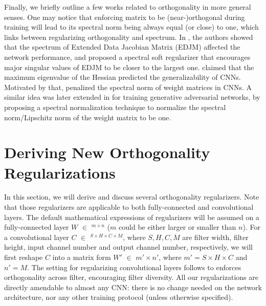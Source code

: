 \documentclass{article}
\newcounter{ass_counter}
\begin{document}
Finally, we briefly outline a few works related to orthogonality in more general senses. One may notice that enforcing matrix to be (near-)orthogonal during training will lead to its spectral norm being always equal (or close) to one, which links between regularizing orthogonality and spectrum. In \cite{wang2016analysis}, the authors showed that the spectrum of Extended Data Jacobian Matrix (EDJM) affected the network performance, and proposed a spectral
soft regularizer that encourages major singular values of EDJM to be closer to the largest one. \cite{keskar2016large} claimed that the maximum eigenvalue of the Hessian predicted the generalizability of CNNs. Motivated by that, \cite{yoshida2017spectral} penalized the spectral norm of weight matrices
in CNNs. A similar idea was later extended in \cite{miyato2018spectral} for training generative adversarial networks, by proposing a spectral normalization technique to normalize the spectral norm/Lipschitz norm of the weight matrix to be one.

\section{Deriving New Orthogonality Regularizations}

In this section, we will derive and discuss several orthogonality regularizers. Note that those regularizers are applicable to both fully-connected and convolutional layers. The default mathematical expressions of regularizers will be assumed on a fully-connected layer $W$ $ \in $ $^{m \times n}$ ($m$ could be either larger or smaller than $n$). For a convolutional layer $ C $  $ \in $ $^{S \times H\times C\times M}$, where $S, H, C, M$ are filter width, filter height, input channel number and output channel number, respectively, we will first reshape $C$ into a matrix form $W'$ $ \in $ $ {m' \times n'}$, where $m' = S \times H \times C$ and $n' = M$. The setting for regularizing convolutional layers follows \cite{xie2017all,huang2017orthogonal} to enforces orthogonality across filter, encouraging filter diversity. All our regularizations are directly amendable to almost any CNN: there is no change needed on the network architecture, nor any other training protocol (unless otherwise specified).
\end{document}

